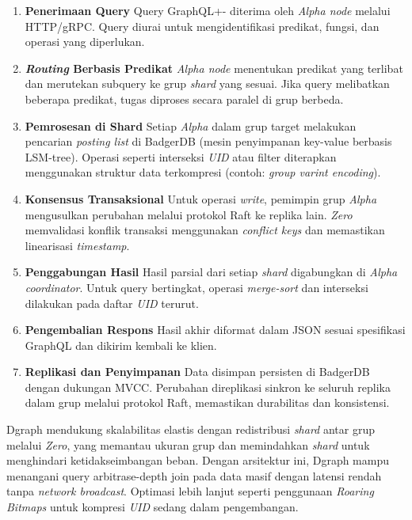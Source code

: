 \begin{enumerate}
  \item \textbf{Penerimaan Query} \newline
  Query GraphQL+- diterima oleh \textit{Alpha node} melalui HTTP/gRPC. Query diurai untuk mengidentifikasi predikat, fungsi, dan operasi yang diperlukan.

  \item \textbf{\textit{Routing} Berbasis Predikat} \newline
  \textit{Alpha node} menentukan predikat yang terlibat dan merutekan subquery ke grup \textit{shard} yang sesuai. Jika query melibatkan beberapa predikat, tugas diproses secara paralel di grup berbeda.

  \item \textbf{Pemrosesan di Shard} \newline
  Setiap \textit{Alpha} dalam grup target melakukan pencarian \textit{posting list} di BadgerDB (mesin penyimpanan key-value berbasis LSM-tree). Operasi seperti interseksi \textit{UID} atau filter diterapkan menggunakan struktur data terkompresi (contoh: \textit{group varint encoding}).

  \item \textbf{Konsensus Transaksional} \newline
  Untuk operasi \textit{write}, pemimpin grup \textit{Alpha} mengusulkan perubahan melalui protokol Raft ke replika lain. \textit{Zero} memvalidasi konflik transaksi menggunakan \textit{conflict keys} dan memastikan linearisasi \textit{timestamp}.

  \item \textbf{Penggabungan Hasil} \newline
  Hasil parsial dari setiap \textit{shard} digabungkan di \textit{Alpha coordinator}. Untuk query bertingkat, operasi \textit{merge-sort} dan interseksi dilakukan pada daftar \textit{UID} terurut.

  \item \textbf{Pengembalian Respons} \newline
  Hasil akhir diformat dalam JSON sesuai spesifikasi GraphQL dan dikirim kembali ke klien.

  \item \textbf{Replikasi dan Penyimpanan} \newline
  Data disimpan persisten di BadgerDB dengan dukungan MVCC. Perubahan direplikasi sinkron ke seluruh replika dalam grup melalui protokol Raft, memastikan durabilitas dan konsistensi.
\end{enumerate}

Dgraph mendukung skalabilitas elastis dengan redistribusi \textit{shard} antar grup melalui \textit{Zero}, yang memantau ukuran grup dan memindahkan \textit{shard} untuk menghindari ketidakseimbangan beban. Dengan arsitektur ini, Dgraph mampu menangani query arbitrase-depth join pada data masif dengan latensi rendah tanpa \textit{network broadcast}. Optimasi lebih lanjut seperti penggunaan \textit{Roaring Bitmaps} untuk kompresi \textit{UID} sedang dalam pengembangan.
